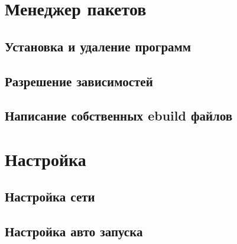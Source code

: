 \documentclass[12pt, a4paper]{article}
\begin{document}
\newpage

\section{Менеджер пакетов}

\subsection{Установка и удаление программ}

\subsection{Разрешение зависимостей}

\subsection{Написание собственных ebuild файлов}

\newpage
\section{Настройка}

\subsection{Настройка сети}

\subsection{Настройка авто запуска}

\end{document}
